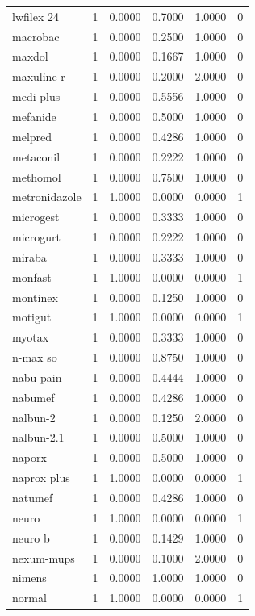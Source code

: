 \begin{longtable}{p{3.0cm}rrrrr}
lwfilex 24 & 1 & 0.0000 & 0.7000 & 1.0000 & 0 \\
macrobac & 1 & 0.0000 & 0.2500 & 1.0000 & 0 \\
maxdol & 1 & 0.0000 & 0.1667 & 1.0000 & 0 \\
maxuline-r & 1 & 0.0000 & 0.2000 & 2.0000 & 0 \\
medi plus & 1 & 0.0000 & 0.5556 & 1.0000 & 0 \\
mefanide & 1 & 0.0000 & 0.5000 & 1.0000 & 0 \\
melpred & 1 & 0.0000 & 0.4286 & 1.0000 & 0 \\
metaconil & 1 & 0.0000 & 0.2222 & 1.0000 & 0 \\
methomol & 1 & 0.0000 & 0.7500 & 1.0000 & 0 \\
metronidazole & 1 & 1.0000 & 0.0000 & 0.0000 & 1 \\
microgest & 1 & 0.0000 & 0.3333 & 1.0000 & 0 \\
microgurt & 1 & 0.0000 & 0.2222 & 1.0000 & 0 \\
miraba & 1 & 0.0000 & 0.3333 & 1.0000 & 0 \\
monfast & 1 & 1.0000 & 0.0000 & 0.0000 & 1 \\
montinex & 1 & 0.0000 & 0.1250 & 1.0000 & 0 \\
motigut & 1 & 1.0000 & 0.0000 & 0.0000 & 1 \\
myotax & 1 & 0.0000 & 0.3333 & 1.0000 & 0 \\
n-max so & 1 & 0.0000 & 0.8750 & 1.0000 & 0 \\
nabu pain & 1 & 0.0000 & 0.4444 & 1.0000 & 0 \\
nabumef & 1 & 0.0000 & 0.4286 & 1.0000 & 0 \\
nalbun-2 & 1 & 0.0000 & 0.1250 & 2.0000 & 0 \\
nalbun-2.1 & 1 & 0.0000 & 0.5000 & 1.0000 & 0 \\
naporx & 1 & 0.0000 & 0.5000 & 1.0000 & 0 \\
naprox plus & 1 & 1.0000 & 0.0000 & 0.0000 & 1 \\
natumef & 1 & 0.0000 & 0.4286 & 1.0000 & 0 \\
neuro & 1 & 1.0000 & 0.0000 & 0.0000 & 1 \\
neuro b & 1 & 0.0000 & 0.1429 & 1.0000 & 0 \\
nexum-mups & 1 & 0.0000 & 0.1000 & 2.0000 & 0 \\
nimens & 1 & 0.0000 & 1.0000 & 1.0000 & 0 \\
normal & 1 & 1.0000 & 0.0000 & 0.0000 & 1 \\

\end{longtable}
